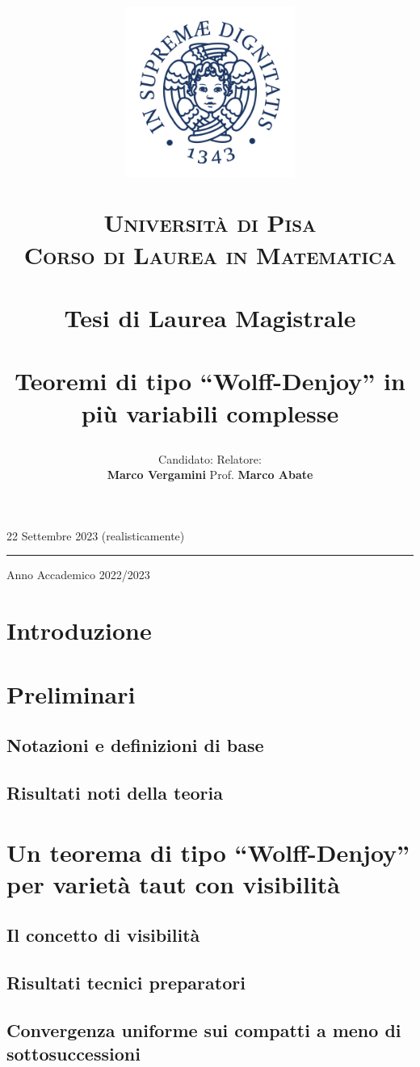\documentclass{article}
\title{\begin{figure}[t!]
    \centering
    \includegraphics[trim=0 55 0 60, clip, width=0.5\textwidth]{Stemma_unipi.jpg}
  \end{figure}
  \vspace{-17.5mm}
  \textsc{\Large Università di Pisa}\\
  \textsc{\large Corso di Laurea in Matematica}\\
  \, \\
  {\large Tesi di Laurea Magistrale}\\
  \, \\
  Teoremi di tipo ``Wolff-Denjoy'' in più variabili complesse}
\author{Candidato:  \hspace{200px} Relatore:\\
  \textbf{Marco Vergamini} \hfill Prof. \textbf{Marco Abate}}
\date{}
\begin{document}
  \maketitle
  \vspace*{\fill}
  \begin{center}
    22 Settembre 2023 (realisticamente)
    \par\noindent\rule{\textwidth}{0.5pt}
    \Large Anno Accademico 2022/2023
  \end{center}
  \newpage
  \tableofcontents
  \newpage


\section*{Introduzione}


\newpage

\section{Preliminari} \label{Preliminari}
\subsection{Notazioni e definizioni di base}

\subsection{Risultati noti della teoria} \label{risnoti}


\newpage

\section{Un teorema di tipo ``Wolff-Denjoy'' per varietà taut con visibilità} \label{Un teorema di tipo ``Wolff-Denjoy'' per varietà taut con visibilità}
\subsection{Il concetto di visibilità}

\subsection{Risultati tecnici preparatori}

\subsection{Convergenza uniforme sui compatti a meno di sottosuccessioni}\label{convcpt}

\end{document}
